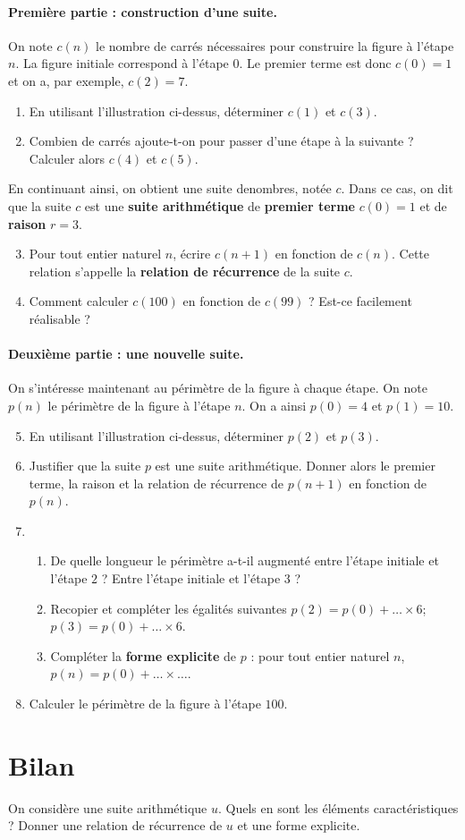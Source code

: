 \documentclass[11pt]{article}
\begin{document}
\paragraph{Première partie : construction d'une suite.} On note $c(n)$ le nombre
de carrés nécessaires pour construire la figure à l'étape $n$. La figure
initiale correspond à l'étape $0$. Le premier terme est donc $c(0)=1$ et on a,
par exemple, $c(2)=7$.
\begin{enumerate}
  \item En utilisant l'illustration ci-dessus, déterminer $c(1)$ et $c(3)$.
  \item Combien de carrés ajoute-t-on pour passer d'une étape à la suivante ?
    Calculer alors $c(4)$ et $c(5)$.
\end{enumerate}
En continuant ainsi, on obtient une suite denombres, notée $c$. Dans ce cas, on
dit que la suite $c$ est une \textbf{suite arithmétique} de \textbf{premier
terme} $c(0)=1$ et de \textbf{raison} $r=3$.
\begin{enumerate}
    \setcounter{enumi}{2}
  \item Pour tout entier naturel $n$, écrire $c(n+1)$ en fonction de $c(n)$.
    Cette relation s'appelle la \textbf{relation de récurrence} de la suite $c$.
  \item Comment calculer $c(100)$ en fonction de $c(99)$ ? Est-ce facilement
    réalisable ?
\end{enumerate}

\paragraph{Deuxième partie : une nouvelle suite.} On s'intéresse maintenant au
périmètre de la figure à chaque étape. On note $p(n)$ le périmètre de la figure
à l'étape $n$. On a ainsi $p(0)=4$ et $p(1)=10$.
\begin{enumerate}
    \setcounter{enumi}{4}
  \item En utilisant l'illustration ci-dessus, déterminer $p(2)$ et $p(3)$.
  \item Justifier que la suite $p$ est une suite arithmétique. Donner alors le
    premier terme, la raison et la relation de récurrence de $p(n+1)$ en
    fonction de $p(n)$.
  \item \begin{enumerate}
      \item De quelle longueur le périmètre a-t-il augmenté entre l'étape
        initiale et l'étape $2$ ? Entre l'étape initiale et l'étape $3$ ?
      \item Recopier et compléter les égalités suivantes
        $p(2)=p(0)+\ldots\times6$; $p(3)=p(0)+\ldots\times6$.
      \item Compléter la \textbf{forme explicite} de $p$ : pour tout entier
        naturel $n$, $p(n) = p(0)+\ldots\times\ldots$.
    \end{enumerate}
  \item Calculer le périmètre de la figure à l'étape $100$.
\end{enumerate}

\section*{Bilan} 
\noindent On considère une suite arithmétique $u$. Quels en sont les éléments
caractéristiques ? Donner une relation de récurrence de $u$ et une forme
explicite.
\end{document}

